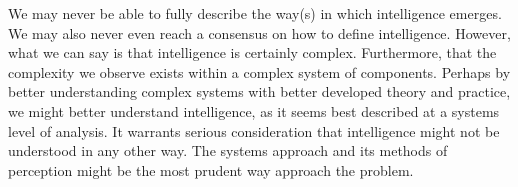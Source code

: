 \documentclass{article}
\begin{document}
We may never be able to fully describe the way(s) in which intelligence emerges. We may also never even reach a consensus on how to define intelligence. However, what we can say is that intelligence is certainly complex. Furthermore, that the complexity we observe exists within a complex system of components. Perhaps by better understanding complex systems with better developed theory and practice, we might better understand intelligence, as it seems best described at a systems level of analysis. It warrants serious consideration that intelligence might not be understood in any other way. The systems approach and its methods of perception might be the most prudent way approach the problem.

\newpage


\end{document}

